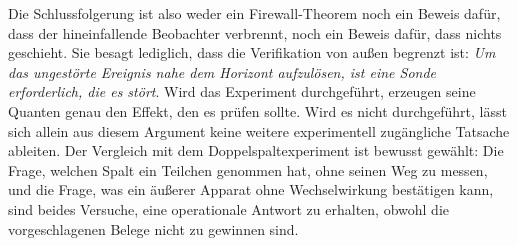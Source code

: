 Die Schlussfolgerung ist also weder ein Firewall-Theorem noch ein Beweis dafür, dass der hineinfallende Beobachter verbrennt, noch ein Beweis dafür, dass nichts geschieht. Sie besagt lediglich, dass die Verifikation von außen begrenzt ist: \emph{Um das ungestörte Ereignis nahe dem Horizont aufzulösen, ist eine Sonde erforderlich, die es stört}.
Wird das Experiment durchgeführt, erzeugen seine Quanten genau den Effekt, den es prüfen sollte. Wird es nicht durchgeführt, lässt sich allein aus diesem Argument keine weitere experimentell zugängliche Tatsache ableiten. Der Vergleich mit dem Doppelspaltexperiment ist bewusst gewählt: Die Frage, welchen Spalt ein Teilchen genommen hat, ohne seinen Weg zu messen, und die Frage, was ein äußerer Apparat ohne Wechselwirkung bestätigen kann, sind beides Versuche, eine operationale Antwort zu erhalten, obwohl die vorgeschlagenen Belege nicht zu gewinnen sind.
